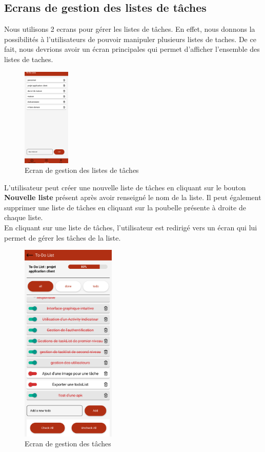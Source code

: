 \documentclass[12pt]{article}
\begin{document}
        \subsection{Ecrans de gestion des listes de tâches}{\label{subsec:task}}
        Nous utilisons 2 ecrans pour gérer les listes de tâches. En effet, nous donnons la possibilités à l'utilisateurs
        de pouvoir manipuler plusieurs listes de taches. De ce fait, nous devrions avoir un écran principales qui permet
        d'afficher l'ensemble des listes de taches.
        \begin{figure}[H]
            \centering
            \includegraphics[width=0.2\textwidth]{images/taskList}
            \caption{Ecran de gestion des listes de tâches}
            \label{fig:taskList}
        \end{figure}
        L'utilisateur peut créer une nouvelle liste de tâches en cliquant sur le bouton \textbf{Nouvelle liste} présent
        après avoir renseigné le nom de la liste. Il peut également supprimer une liste de tâches en cliquant sur la poubelle
        présente à droite de chaque liste.\\
        En cliquant sur une liste de tâches, l'utilisateur est redirigé vers un écran qui lui permet de gérer les tâches
        de la liste.\\
        \begin{figure}[H]
            \centering
            \includegraphics[width=0.4\textwidth]{images/tasks}
            \caption{Ecran de gestion des tâches}
            \label{fig:task}
        \end{figure}
\end{document}
